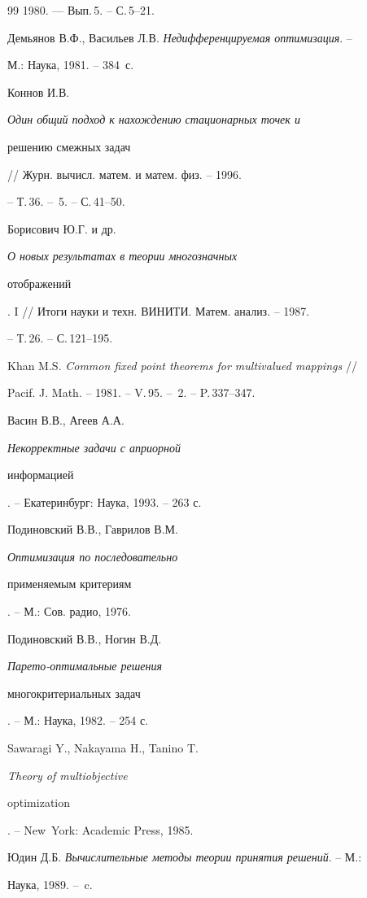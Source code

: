 \begin{thebibliography}{99}
1980. --- Вып.\,5. -- С.\,5--21.




Демьянов В.Ф., Васильев Л.В. {\em Недифференцируемая оптимизация}. --


М.: Наука, 1981. -- 384~с.




Коннов И.В. {\em Один общий подход к нахождению стационарных точек и


решению смежных задач} // Журн. вычисл. матем. и матем. физ. -- 1996.


-- Т.\,36. -- \No\,5. -- С.\,41--50.




Борисович Ю.Г. и др. {\em О новых результатах в теории многозначных


отображений}. I // Итоги науки и техн. ВИНИТИ. Матем. анализ. -- 1987.


-- Т.\,26. -- С.\,121--195.




Khan M.S. {\em Common fixed point theorems for multivalued mappings} //


Pacif. J. Math. -- 1981. -- V.\,95. -- \No\,2. -- P.\,337--347.




Васин В.В., Агеев А.А. {\em Некорректные задачи с априорной


информацией}. -- Екатеринбург: Наука, 1993. -- 263 с.




Подиновский В.В., Гаврилов В.М. {\em Оптимизация по последовательно


применяемым критериям}. -- М.: Сов. радио, 1976.




Подиновский В.В., Ногин В.Д. {\em Парето-оптимальные решения


многокритериальных задач}. -- М.: Наука, 1982. -- 254 с.




Sawaragi Y., Nakayama H., Tanino T. {\em Theory of multiobjective


optimization}. -- New~York: Academic Press, 1985.




Юдин Д.Б. {\em Вычислительные методы теории принятия решений}. -- М.:


Наука, 1989. --~c.



\end{thebibliography}
